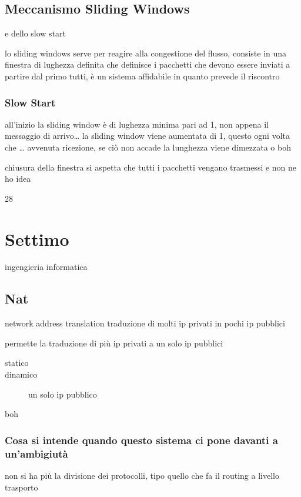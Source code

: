 \documentclass[11pt]{article}
\begin{document}
\subsection{Meccanismo Sliding Windows}
\label{sec:orga559a2a}
e dello slow start

lo sliding windows serve per reagire alla congestione del flusso, consiste in una finestra di lughezza definita che definisce i pacchetti che devono essere inviati a partire dal primo tutti, è un sistema affidabile in quanto prevede il riscontro

\subsubsection{Slow Start}
\label{sec:orga9ec519}
all'inizio la sliding window è di lughezza minima pari ad 1, non appena il messaggio di arrivo\ldots{} la sliding window viene aumentata di 1, questo ogni volta che \ldots{} avvenuta ricezione, se ciò non accade la lunghezza viene dimezzata o boh

chiusura della finestra si aspetta che tutti i pacchetti vengano trasmessi e non ne ho idea

28

\section{Settimo}
\label{sec:org48fa550}
ingengieria informatica
\subsection{Nat}
\label{sec:org3b59b5a}
network address translation
traduzione di molti ip privati in pochi ip pubblici

permette la traduzione di più ip privati a un solo ip pubblici
\begin{description}
\item[{statico}] 

\item[{dinamico}] un solo ip pubblico
\item[{boh}] 
\end{description}

\subsubsection{Cosa si intende quando questo sistema ci pone davanti a un'ambigiutà}
\label{sec:org9445f9c}
non si ha più la divisione dei protocolli, tipo quello che fa il routing a livello trasporto  
\end{document}

